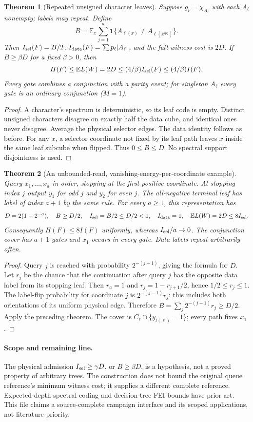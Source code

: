 \documentclass{article}
\newtheorem{theorem}{Theorem}
\begin{document}
\begin{theorem}[Repeated unsigned character leaves]
Suppose $g_\ell=\chi_{A_\ell}$ with each $A_\ell$ nonempty; labels may
repeat. Define
\[
 B=\mathbb E_x\sum_{j=1}^a
       \mathbf1\{A_{\ell(x)}\ne A_{\ell(x^{\oplus j})}\}.
\]
Then $I_{\rm sel}(F)=B/2$, $I_{\rm data}(F)=\sum p_\ell|A_\ell|$,
and the full witness cost is $2D$. If $B\ge\beta D$ for a fixed
$\beta>0$, then
\[
 H(F)\le\mathbb E L(W)=2D\le(4/\beta)I_{\rm sel}(F)
 \le(4/\beta)I(F).
\]
Every gate combines a conjunction with a parity event; for singleton
$A_\ell$ every gate is an ordinary conjunction ($M=1$).
\end{theorem}
\begin{proof}
A character's spectrum is deterministic, so its leaf code is empty.
Distinct unsigned characters disagree on exactly half the data cube,
and identical ones never disagree. Average the physical selector edges.
The data identity follows as before. For any $x$, a selector coordinate
not fixed by its leaf path leaves $x$ inside the same leaf subcube when
flipped. Thus $0\le B\le D$. No spectral support disjointness is used.
\end{proof}

\begin{theorem}[An unbounded-read, vanishing-energy-per-coordinate example]
Query $x_1,\ldots,x_a$ in order, stopping at the first positive coordinate.
At stopping index $j$ output $y_1$ for odd $j$ and $y_2$ for even $j$.
The all-negative terminal leaf has label of index $a+1$ by the same rule.
For every $a\ge1$, this representation has
\[
 D=2(1-2^{-a}),\quad B\ge D/2,\quad
 I_{\rm sel}=B/2\le D/2<1,\quad I_{\rm data}=1,
 \quad \mathbb E L(W)=2D\le8I_{\rm sel}.
\]
Consequently $H(F)\le8I(F)$ uniformly, whereas $I_{\rm sel}/a\to0$.
The conjunction cover has $a+1$ gates and $x_1$ occurs in every gate.
Data labels repeat arbitrarily often.
\end{theorem}
\begin{proof}
Query $j$ is reached with probability $2^{-(j-1)}$, giving the formula
for $D$. Let $r_j$ be the chance that the continuation after query $j$
has the opposite data label from its stopping leaf. Then $r_a=1$ and
$r_j=1-r_{j+1}/2$, hence $1/2\le r_j\le1$. The label-flip probability
for coordinate $j$ is $2^{-(j-1)}r_j$: this includes both orientations
of its uniform physical edge. Therefore
$B=\sum_j2^{-(j-1)}r_j\ge D/2$. Apply the preceding theorem.
The cover is $C_\ell\cap\{y_{t(\ell)}=1\}$; every path fixes $x_1$.
\end{proof}

\paragraph{Scope and remaining line.}
The physical admission $I_{\rm sel}\ge\gamma D$, or $B\ge\beta D$,
is a hypothesis, not a proved property of arbitrary trees. The construction
does not bound the original queue reference's minimum witness cost; it
supplies a different complete reference. Expected-depth spectral coding
and decision-tree FEI bounds have prior art. This file claims a source-complete
campaign interface and its scoped applications, not literature priority.
\end{document}

